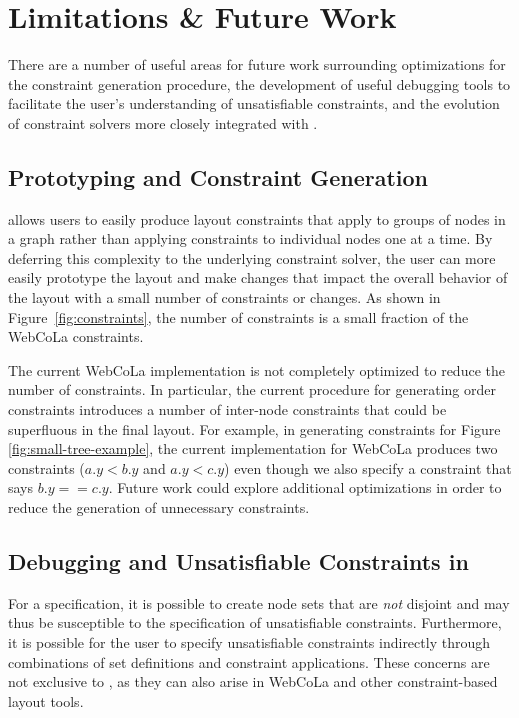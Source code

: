 \section{Limitations \& Future Work}
\constraintsFigure
There are a number of useful areas for future work surrounding optimizations
for the constraint generation procedure, the development of useful debugging
tools to facilitate the user's understanding of unsatisfiable constraints,
and the evolution of constraint solvers more closely integrated with \projectname.



\subsection{Prototyping and Constraint Generation}
\projectname allows users to easily produce layout constraints that apply
to groups of nodes in a graph rather than applying constraints to individual
nodes one at a time. By deferring this complexity to the underlying constraint
solver, the user can more easily prototype the layout and make changes that
impact the overall behavior of the layout with a small number of constraints 
or changes. As shown in Figure~\ref{fig:constraints},
the number of \projectname constraints is a small fraction of the WebCoLa constraints.

The current WebCoLa implementation is not completely optimized to reduce the
number of constraints. In particular, the current procedure for generating
order constraints introduces a number of inter-node constraints that could
be superfluous in the final layout. For example, in generating constraints
for Figure \ref{fig:small-tree-example}, the current \projectname implementation
for WebCoLa produces two constraints ($a.y < b.y$ and $a.y < c.y$) even though
we also specify a constraint that says $b.y == c.y$. Future work could explore
additional optimizations in order to
reduce the generation of unnecessary constraints.

\subsection{Debugging and Unsatisfiable Constraints in \projectname}
For a \projectname specification, it is possible to create node sets that
are \emph{not} disjoint and may thus be susceptible to the
specification of unsatisfiable constraints. Furthermore, it is
possible for the user to specify unsatisfiable constraints indirectly through
combinations of set definitions and constraint applications. These concerns
are not exclusive to \projectname, as they can also arise
in WebCoLa and other constraint-based layout tools.

